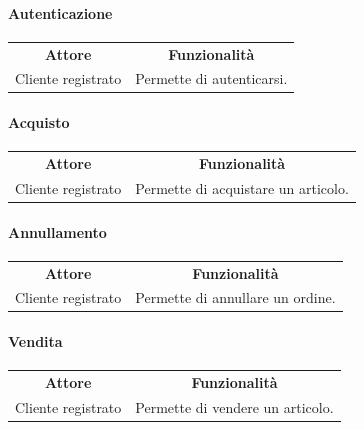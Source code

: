\documentclass[12pt]{article}
\begin{document}
\paragraph*{Autenticazione}
\begin{center}
\begin{tabular}{|c|c|}
\rowcolor[gray]{0.8}
\hline
\textbf{Attore} & \textbf{Funzionalità} \\
Cliente registrato & Permette di autenticarsi. \\
\hline
\end{tabular}
\end{center}

\paragraph*{Acquisto}
\begin{center}
\begin{tabular}{|c|c|}
\rowcolor[gray]{0.8}
\hline
\textbf{Attore} & \textbf{Funzionalità} \\
Cliente registrato & Permette di acquistare un articolo. \\
\hline
\end{tabular}
\end{center}

\paragraph*{Annullamento}
\begin{center}
\begin{tabular}{|c|c|}
\rowcolor[gray]{0.8}
\hline
\textbf{Attore} & \textbf{Funzionalità} \\
Cliente registrato & Permette di annullare un ordine. \\
\hline
\end{tabular}
\end{center}

\paragraph*{Vendita}
\begin{center}
\begin{tabular}{|c|c|}
\rowcolor[gray]{0.8}
\hline
\textbf{Attore} & \textbf{Funzionalità} \\
Cliente registrato & Permette di vendere un articolo. \\
\hline
\end{tabular}
\end{center}
\end{document}
